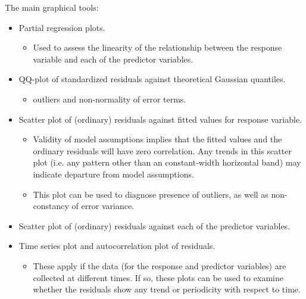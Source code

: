 \documentclass{article}
\begin{document}
\vskip 0.75cm
\noindent The main graphical tools:
\begin{center}
\begin{minipage}{17cm}
\begin{itemize}
\item Partial regression plots.
         \begin{itemize}
         \item  Used to assess the linearity of the relationship between the response variable and each of the predictor variables.
         \end{itemize}
\item QQ-plot of standardized residuals against theoretical Gaussian quantiles.
         \begin{itemize}
         \item outliers and non-normality of error terms.
         \end{itemize} 
\item Scatter plot of (ordinary) residuals against fitted values for response variable.
         \begin{itemize}
         \item Validity of model assumptions implies that the fitted values and the ordinary residuals will have zero correlation.
                  Any trends in this scatter plot (i.e. any pattern other than an constant-width horizontal band) may indicate departure
                  from model assumptions.
         \item This plot can be used to diagnose presence of outliers, as well as non-constancy of error variance.
         \end{itemize} 
\item Scatter plot of (ordinary) residuals against each of the predictor variables.
\item Time series plot and autocorrelation plot of residuals.
         \begin{itemize}
         \item These apply if the data (for the response and predictor variables) are collected at different times.
                  If so, these plots can be used to examine whether the residuals show any trend or periodicity with respect to time.
         \end{itemize}
\end{itemize}
\end{minipage}
\end{center}
\end{document}
